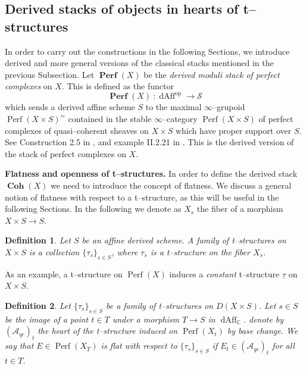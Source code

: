 \documentclass[11pt]{article}
\newtheorem{definition}{Definition}
\newcommand{\BC}{\mathbb{C}}
\newcommand{\perf}{\operatorname{Perf}(X)}
\newcommand{\perfstack}{\boldsymbol{\operatorname{Perf}}(X)}
\newcommand{\cohflat}{\boldsymbol{\operatorname{Coh}}}
\begin{document}
\subsection{Derived stacks of objects in hearts of t--structures }\label{subsec : Derived stacks of objects in hearts of t--structures }
    In order to carry out the constructions in the following Sections, we introduce derived and more general versions of the classical stacks mentioned in the previous Subsection. Let $\perfstack$ be the \textit{derived moduli stack of perfect complexes} on $X$. This is defined as the functor
    \begin{equation}\label{eqn : perf functor}
\perfstack\ \colon \operatorname{dAff}^{\operatorname{op}} \longrightarrow \mathcal{S}
    \end{equation}    
    which sends a derived affine scheme $S$ to the maximal $\infty$--grupoid $\operatorname{Perf}(X\times S)^{\simeq}$ contained in the stable $\infty$--category $\operatorname{Perf}(X\times S)$ of perfect complexes of quasi--coherent sheaves on $X\times S$ which have proper support over $S$. See Construction 2.5 in \cite{Porta2019TwodimensionalCH}, and example II.2.21 in \cite{dps}. This is the derived version of the stack of perfect complexes on $X$. \newline

    
    \noindent\textbf{Flatness and openness of t--structures. }
    In order to define the derived stack $\cohflat(X)$ we need to introduce the concept of flatness. We discuss a general notion of flatness with respect to a t--structure, as this will be useful in the following Sections. In the following we denote as $X_s$ the fiber of a morphism $X \times S \rightarrow S$.
    \begin{definition}
        Let $S$ be an affine derived scheme. A \textit{family of t--structures on }$X\times S$ is a collection $\{\tau_s\}_{s\in S}$, where $\tau_s$ is a t--structure on the fiber $X_{s}$.
    \end{definition}

    \noindent As an example, a t--structure on $\perf$ induces a \textit{constant} t--structure $\underline{\tau}$ on $X\times S$.

    \begin{definition}
        Let $\{\tau_s\}_{s\in S}$ be a family of t--structures on $D(X\times S)$. Let $s\in S$ be the image of a point $t\in T$ under a morphism $T \rightarrow S$ in $\operatorname{dAff}_{\BC}$. denote by $(\mathcal{A}_{qc})_t$ the heart of the t--structure induced on $\operatorname{Perf}(X_t)$ by base change. We say that $E\in \operatorname{Perf}(X_T)$ is \textit{flat with respect to} $\{\tau_s\}_{s\in S}$ if $E_t\in (\mathcal{A}_{qc})_t$ for all $t\in T$.
    \end{definition}
    
\end{document}
